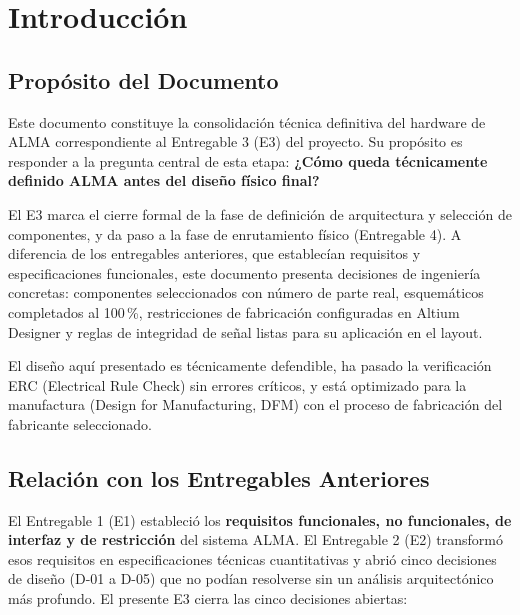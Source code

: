 \chapter{Introducción}
\label{chap:introduccion}

\section{Propósito del Documento}
\label{sec:intro_proposito}

Este documento constituye la consolidación técnica definitiva del hardware de ALMA correspondiente al Entregable 3 (E3) del proyecto. Su propósito es responder a la pregunta central de esta etapa: \textbf{¿Cómo queda técnicamente definido ALMA antes del diseño físico final?}

El E3 marca el cierre formal de la fase de definición de arquitectura y selección de componentes, y da paso a la fase de enrutamiento físico (Entregable 4). A diferencia de los entregables anteriores, que establecían requisitos y especificaciones funcionales, este documento presenta decisiones de ingeniería concretas: componentes seleccionados con número de parte real, esquemáticos completados al 100\,\%, restricciones de fabricación configuradas en Altium Designer y reglas de integridad de señal listas para su aplicación en el layout.

El diseño aquí presentado es técnicamente defendible, ha pasado la verificación ERC (Electrical Rule Check) sin errores críticos, y está optimizado para la manufactura (Design for Manufacturing, DFM) con el proceso de fabricación del fabricante seleccionado.

\section{Relación con los Entregables Anteriores}
\label{sec:intro_relacion}

El Entregable 1 (E1) estableció los \textbf{requisitos funcionales, no funcionales, de interfaz y de restricción} del sistema ALMA. El Entregable 2 (E2) transformó esos requisitos en especificaciones técnicas cuantitativas y abrió cinco decisiones de diseño (D-01 a D-05) que no podían resolverse sin un análisis arquitectónico más profundo. El presente E3 cierra las cinco decisiones abiertas:

